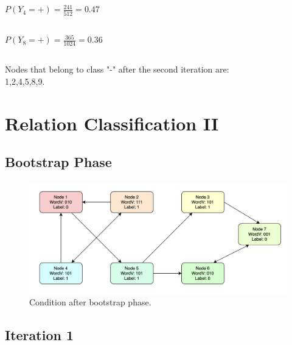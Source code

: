 \documentclass[a4paper,11pt]{article}
\begin{document}
\subsection{}
$P(Y_4 = +) =  \frac{241}{512} = 0.47$

\subsection{}
$P(Y_8 = +) = \frac{365}{1024} = 0.36$

\subsection{}
Nodes that belong to class "-" after the second iteration are:
\\
1,2,4,5,8,9.



\section{Relation Classification II}

\subsection{Bootstrap Phase}

\begin{figure}[ht!]
    \centering
    \includegraphics[width=130mm]{Figures/3_1.png}
    \caption{Condition after bootstrap phase.}
\end{figure}

\newpage
\subsection{Iteration 1}
\end{document}
